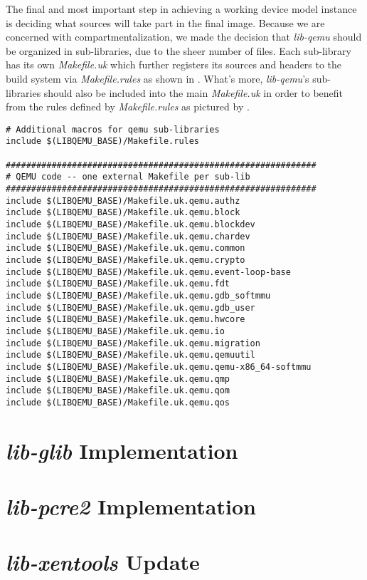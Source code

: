 The final and most important step in achieving a working device model instance is deciding what sources will take part in the final image.
Because we are concerned with compartmentalization, we made the decision that \textit{lib-qemu} should be organized in sub-libraries, due to the sheer number of files.
Each sub-library has its own \textit{Makefile.uk} which further registers its sources and headers to the build system via \textit{Makefile.rules} as shown in .
What's more, \textit{lib-qemu}'s sub-libraries should also be included into the main \textit{Makefile.uk} in order to benefit from the rules defined by \textit{Makefile.rules} as pictured by .

\begin{lstlisting}
# Additional macros for qemu sub-libraries
include $(LIBQEMU_BASE)/Makefile.rules

#############################################################
# QEMU code -- one external Makefile per sub-lib
#############################################################
include $(LIBQEMU_BASE)/Makefile.uk.qemu.authz
include $(LIBQEMU_BASE)/Makefile.uk.qemu.block
include $(LIBQEMU_BASE)/Makefile.uk.qemu.blockdev
include $(LIBQEMU_BASE)/Makefile.uk.qemu.chardev
include $(LIBQEMU_BASE)/Makefile.uk.qemu.common
include $(LIBQEMU_BASE)/Makefile.uk.qemu.crypto
include $(LIBQEMU_BASE)/Makefile.uk.qemu.event-loop-base
include $(LIBQEMU_BASE)/Makefile.uk.qemu.fdt
include $(LIBQEMU_BASE)/Makefile.uk.qemu.gdb_softmmu
include $(LIBQEMU_BASE)/Makefile.uk.qemu.gdb_user
include $(LIBQEMU_BASE)/Makefile.uk.qemu.hwcore
include $(LIBQEMU_BASE)/Makefile.uk.qemu.io
include $(LIBQEMU_BASE)/Makefile.uk.qemu.migration
include $(LIBQEMU_BASE)/Makefile.uk.qemu.qemuutil
include $(LIBQEMU_BASE)/Makefile.uk.qemu.qemu-x86_64-softmmu
include $(LIBQEMU_BASE)/Makefile.uk.qemu.qmp
include $(LIBQEMU_BASE)/Makefile.uk.qemu.qom
include $(LIBQEMU_BASE)/Makefile.uk.qemu.qos
\end{lstlisting}

\section{\textit{lib-glib} Implementation}
\label{sec:impl-lib-glib}

\section{\textit{lib-pcre2} Implementation}
\label{impl-lib-pcre2}

\section{\textit{lib-xentools} Update}
